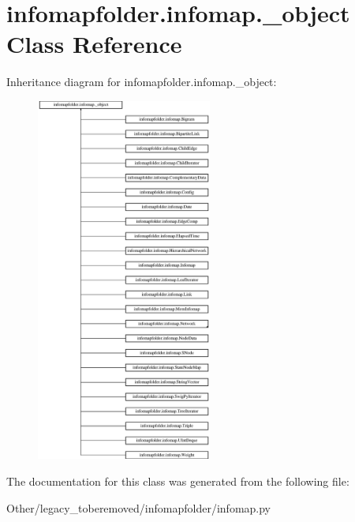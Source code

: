 \hypertarget{classinfomapfolder_1_1infomap_1_1__object}{}\section{infomapfolder.\+infomap.\+\_\+object Class Reference}
\label{classinfomapfolder_1_1infomap_1_1__object}
Inheritance diagram for infomapfolder.\+infomap.\+\_\+object\+:\begin{figure}[H]
\begin{center}
\leavevmode
\includegraphics[height=12.000000cm]{classinfomapfolder_1_1infomap_1_1__object}
\end{center}
\end{figure}


The documentation for this class was generated from the following file\+:\begin{DoxyCompactItemize}
\item 
Other/legacy\+\_\+toberemoved/infomapfolder/infomap.\+py\end{DoxyCompactItemize}
